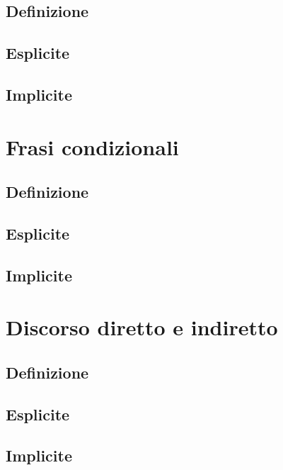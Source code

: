 \documentclass[a4paper,twoside,11pt,chapterprefix=false,bibliography=totocnumbered,listof=flat]{scrbook}
\begin{document}
\hypertarget{definizione-3}{%
\section{Definizione}\label{definizione-3}}

\hypertarget{esplicite-5}{%
\section{Esplicite}\label{esplicite-5}}

\hypertarget{implicite-5}{%
\section{Implicite}\label{implicite-5}}

\hypertarget{frasi-condizionali}{%
\chapter{Frasi condizionali}\label{frasi-condizionali}}

\hypertarget{definizione-4}{%
\section{Definizione}\label{definizione-4}}

\hypertarget{esplicite-6}{%
\section{Esplicite}\label{esplicite-6}}

\hypertarget{implicite-6}{%
\section{Implicite}\label{implicite-6}}

\hypertarget{discorso-diretto-e-indiretto}{%
\chapter{Discorso diretto e
indiretto}\label{discorso-diretto-e-indiretto}}

\hypertarget{definizione-5}{%
\section{Definizione}\label{definizione-5}}

\hypertarget{esplicite-7}{%
\section{Esplicite}\label{esplicite-7}}

\hypertarget{implicite-7}{%
\section{Implicite}\label{implicite-7}}


\end{document}
